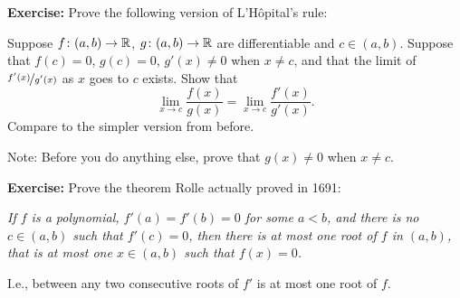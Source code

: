 \documentclass[10pt,aspectratio=149]{beamer}
\begin{document}
\begin{frame}

\textbf{Exercise:}
Prove the following version of L'H\^opital's rule:

\pause
Suppose 
$f \colon (a,b) \to {\mathbb{R}}$, $g \colon (a,b) \to {\mathbb{R}}$ are differentiable
and $c \in (a,b)$.
\pause
Suppose that $f(c) = 0$, $g(c)=0$,
$g'(x) \not= 0$ when $x \not= c$, and
that the limit of $\nicefrac{f'(x)}{g'(x)}$ as $x$ goes to $c$ exists.
\pause
Show that
\begin{equation*}
\lim_{x \to c} \frac{f(x)}{g(x)} = 
\lim_{x \to c} \frac{f'(x)}{g'(x)} .
\end{equation*}
\pause
Compare to the simpler version from before.

\pause
Note: Before you do anything else, prove that $g(x) \not= 0$ when $x \not= c$.

\pause
\medskip

\textbf{Exercise:}
Prove the theorem Rolle actually proved in 1691:
\pause

\medskip

\emph{If $f$ is a polynomial,
$f'(a) = f'(b) = 0$ for some $a < b$,
and there is no $c \in (a,b)$ such that $f'(c) = 0$,
then there is at most one root of $f$ in $(a,b)$,
that is at most one $x \in (a,b)$ such that $f(x) = 0$.}
\pause

\medskip

I.e., between any two consecutive roots of $f'$ is at most one
root of $f$.

\end{frame}
\end{document}
